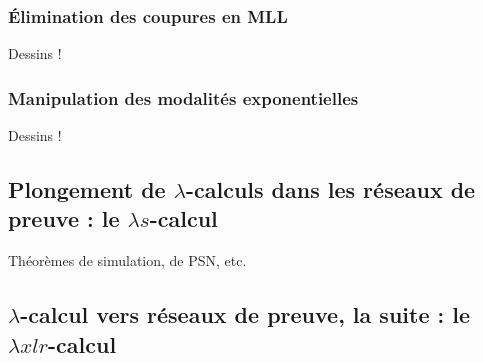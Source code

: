 \documentclass[a4paper, 11pt]{article}
\begin{document}
\subsubsection{Élimination des coupures en MLL}

Dessins !

\subsubsection{Manipulation des modalités exponentielles}

Dessins !

\subsection{Plongement de $\lambda$-calculs dans les réseaux de preuve : le $\lambda s$-calcul}

Théorèmes de simulation, de PSN, etc. 

\subsection{$\lambda$-calcul vers réseaux de preuve, la suite : le $\lambda x l r$-calcul}
\end{document}
